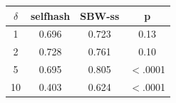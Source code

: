 \begin{tabular}{@{}cccc@{}}
\toprule
$\delta$ & selfhash & SBW-ss & p \\
\midrule
1 & 0.696 & 0.723 & 0.13 \\
2 & 0.728 & 0.761 & 0.10 \\
5 & 0.695 & 0.805 & $<$.0001 \\
10 & 0.403 & 0.624 & $<$.0001 \\
\bottomrule
\end{tabular}
